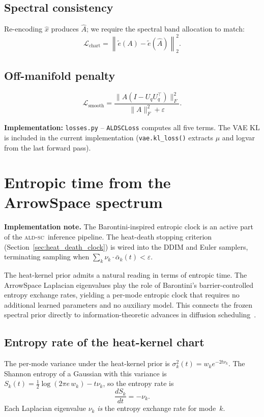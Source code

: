 \documentclass[11pt]{article}
\newcommand{\ALDSC}{\textsc{ald-sc}}
\newcommand{\Uq}{U_q}
\begin{document}
    \subsection{Spectral consistency}
    Re-encoding $\hat x$ produces $\hat A$; we require the spectral
    band allocation to match:
    \[\mathcal{L}_{\mathrm{chart}} = \left\| \tilde e(A) - \tilde
    e(\hat A) \right\|_2^2.\]

    \subsection{Off-manifold penalty}
    \[\mathcal{L}_{\mathrm{smooth}} = \frac{
    \|A(I-\Uq\Uq^\top)\|_F^2 }{ \|A\|_F^2 + \varepsilon }.\]

    \noindent\textbf{Implementation:} \texttt{losses.py} --
    \texttt{ALDSCLoss} computes all five terms. The VAE KL is
    included in the current implementation (\texttt{vae.kl\_loss()}
    extracts $\mu$ and logvar from the last forward pass).

    \section{Entropic time from the ArrowSpace spectrum}
    \label{sec:entropic_clock}

    \noindent\textbf{Implementation note.} The Barontini-inspired
    entropic clock is an active part of the \ALDSC~inference pipeline.
    The heat-death stopping criterion (Section~\ref{sec:heat_death_clock})
    is wired into the DDIM and Euler samplers, terminating sampling
    when $\sum_k \nu_k \cdot \bar\alpha_k(t) < \varepsilon$.

    The heat-kernel prior admits a natural reading in terms of
    entropic time. The ArrowSpace Laplacian eigenvalues play the role
    of Barontini's barrier-controlled entropy exchange rates, yielding
    a per-mode entropic clock that requires no additional learned
    parameters and no auxiliary model. This connects the frozen
    spectral prior directly to information-theoretic advances in
    diffusion scheduling~\cite{Stancevic2025}.

    \subsection{Entropy rate of the heat-kernel chart}
    \label{sec:entropy_rate}
    The per-mode variance under the heat-kernel prior is
    $\sigma_k^2(t) = w_k e^{-2t\nu_k}$. The Shannon entropy of a
    Gaussian with this variance is $S_k(t) = \tfrac{1}{2}\log(2\pi e\,
    w_k) - t\nu_k$, so the entropy rate is
    \[\boxed{\frac{dS_k}{dt} = -\nu_k.}\]
    Each Laplacian eigenvalue $\nu_k$ \emph{is} the entropy exchange
    rate for mode~$k$.
\end{document}
